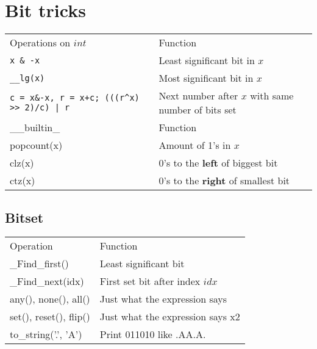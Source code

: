 \section{Bit tricks}
\vspace{-5pt}

\begin{tabular}{ |p{3cm}|p{5cm}|  }
  \hline  
  \rowcolor{Blue} 
  \multicolumn{2}{|c|}{Bits++} \\
  \hline
  \rowcolor{LightBlue2} 
  Operations on $int$ & Function \\
  \hline
  \texttt{x \& -x} & Least significant bit in $x$ \\
  \rowcolor{Gray} 
  \texttt{\_\_lg(x)} & Most significant bit in $x$ \\
  \texttt{c = x\&-x, r = x+c; (((r\^{}x) >> 2)/c) | r} & Next number after $x$ with same number of bits set \\
  \hline

  \rowcolor{LightBlue2} 
  \_\_builtin\_ & Function \\
  \hline 
  popcount(x) & Amount of 1's in $x$ \\
  \rowcolor{Gray} 
  clz(x) & 0's to the \textbf{left} of biggest bit \\
  ctz(x) & 0's to the \textbf{right} of smallest bit \\
  \hline
\end{tabular}

\subsection{Bitset} 
\vspace{-5pt}

\begin{tabular}{ |p{3cm}|p{5cm}|  }
  \hline 
  \rowcolor{Blue} 
  \multicolumn{2}{|c|}{Bitset<Size>} \\
  \hline
  \rowcolor{LightBlue2} 
  Operation & Function \\
  \hline
  \_Find\_first() & Least significant bit \\
  \rowcolor{Gray} 
  \_Find\_next(idx) & First set bit after index $idx$ \\
  any(), none(), all() & Just what the expression says \\
  \rowcolor{Gray} 
  set(), reset(), flip() & Just what the expression says x2 \\
  to\_string('.', 'A') & Print 011010 like .AA.A. \\
  \hline
\end{tabular}

% 

